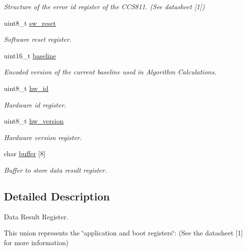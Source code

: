 \begin{DoxyCompactItemize}
\begin{tabbing}
\end{tabbing}\begin{DoxyCompactList}\small\item\em Structure of the error id register of the C\+C\+S811. (See datasheet \mbox{[}1\mbox{]}) \end{DoxyCompactList}\item 
uint8\+\_\+t \mbox{\hyperlink{union_application_register_a043a3ed1b7aa1a2f596608dd4e6222b2}{sw\+\_\+reset}}
\begin{DoxyCompactList}\small\item\em Software reset register. \end{DoxyCompactList}\item 
uint16\+\_\+t \mbox{\hyperlink{union_application_register_ae5b7baf8a03c8658a511369ee726b08a}{baseline}}
\begin{DoxyCompactList}\small\item\em Encoded version of the current baseline used in Algorithm Calculations. \end{DoxyCompactList}\item 
uint8\+\_\+t \mbox{\hyperlink{union_application_register_a93124d2e13be33bebf0974c52bcf4a95}{hw\+\_\+id}}
\begin{DoxyCompactList}\small\item\em Hardware id register. \end{DoxyCompactList}\item 
uint8\+\_\+t \mbox{\hyperlink{union_application_register_a6461924e20c4d86bd9d51a48fb7b1864}{hw\+\_\+version}}
\begin{DoxyCompactList}\small\item\em Hardware version register. \end{DoxyCompactList}\item 
char \mbox{\hyperlink{union_application_register_a4935b1dbe41ddae16157f83bd161c550}{buffer}} \mbox{[}8\mbox{]}
\begin{DoxyCompactList}\small\item\em Buffer to store data result register. \end{DoxyCompactList}\end{DoxyCompactItemize}


\subsection{Detailed Description}
Data Result Register. 

This union represents the \char`\"{}application and boot registers\char`\"{}\+: (See the datasheet \mbox{[}1\mbox{]} for more information) 

